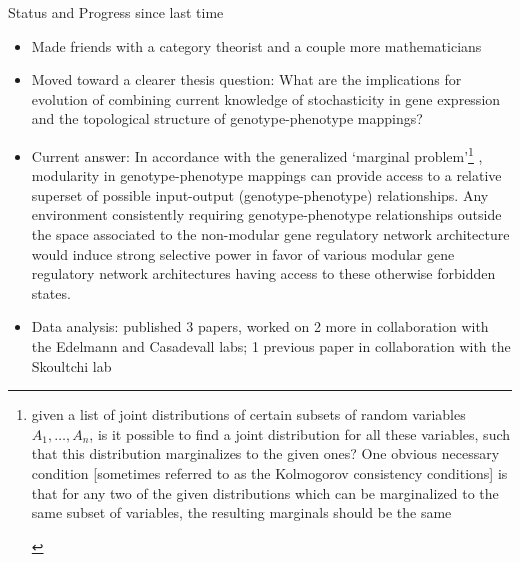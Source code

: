 \begin{frame}
    \begin{block}{Status and Progress since last time}
    \begin{scriptsize}
    \begin{itemize}
    \item Made friends with a category theorist and a couple more mathematicians
    \item Moved toward a clearer thesis question: What are the implications for evolution of combining current knowledge of stochasticity in gene expression and the topological structure of genotype-phenotype mappings?
    \item Current answer: In accordance with the generalized `marginal problem'\footnote{\begin{tiny}
given a list of joint distributions of certain subsets of random variables $A_1, \ldots , A_n$, is it possible to find a joint distribution for all these variables, such that this distribution marginalizes to the given ones? One obvious necessary condition [sometimes referred to as the Kolmogorov consistency conditions] is that for any two of the given distributions which can be marginalized to the same subset of variables, the resulting marginals should be the same \cite{Fritz}
    \end{tiny}} , modularity in genotype-phenotype mappings can provide access to a relative superset of possible input-output (genotype-phenotype) relationships. Any environment consistently requiring genotype-phenotype relationships outside the space associated to the non-modular gene regulatory network architecture would induce strong selective power in favor of various modular gene regulatory network architectures having access to these otherwise forbidden states.
    \item Data analysis: published 3 papers, worked on 2 more in collaboration with the Edelmann and Casadevall labs; 1 previous paper in collaboration with the Skoultchi lab
    \end{itemize}
    \end{scriptsize}
    \end{block}
    \end{frame}
